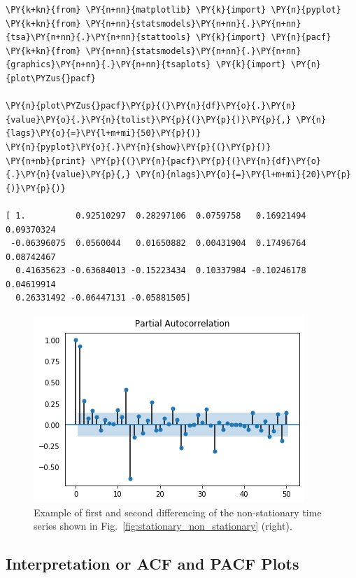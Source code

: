 \begin{codebox}[breakable, size=fbox, boxrule=1pt, pad at break*=1mm,colback=cellbackground, colframe=cellborder]
\begin{Verbatim}[commandchars=\\\{\}]
\PY{k+kn}{from} \PY{n+nn}{matplotlib} \PY{k}{import} \PY{n}{pyplot}
\PY{k+kn}{from} \PY{n+nn}{statsmodels}\PY{n+nn}{.}\PY{n+nn}{tsa}\PY{n+nn}{.}\PY{n+nn}{stattools} \PY{k}{import} \PY{n}{pacf}
\PY{k+kn}{from} \PY{n+nn}{statsmodels}\PY{n+nn}{.}\PY{n+nn}{graphics}\PY{n+nn}{.}\PY{n+nn}{tsaplots} \PY{k}{import} \PY{n}{plot\PYZus{}pacf}

\PY{n}{plot\PYZus{}pacf}\PY{p}{(}\PY{n}{df}\PY{o}{.}\PY{n}{value}\PY{o}{.}\PY{n}{tolist}\PY{p}{(}\PY{p}{)}\PY{p}{,} \PY{n}{lags}\PY{o}{=}\PY{l+m+mi}{50}\PY{p}{)}
\PY{n}{pyplot}\PY{o}{.}\PY{n}{show}\PY{p}{(}\PY{p}{)}
\PY{n+nb}{print} \PY{p}{(}\PY{n}{pacf}\PY{p}{(}\PY{n}{df}\PY{o}{.}\PY{n}{value}\PY{p}{,} \PY{n}{nlags}\PY{o}{=}\PY{l+m+mi}{20}\PY{p}{)}\PY{p}{)}

[ 1.          0.92510297  0.28297106  0.0759758   0.16921494  0.09370324
 -0.06396075  0.0560044   0.01650882  0.00431904  0.17496764  0.08742467
  0.41635623 -0.63684013 -0.15223434  0.10337984 -0.10246178  0.04619914
  0.26331492 -0.06447131 -0.05881505]
\end{Verbatim}
\end{codebox}

\begin{figure}[htb]
	\centering
	\includegraphics[width=0.7\linewidth]{figures/pacf_plot.png}
	\caption{Example of first and second differencing of the non-stationary time series shown in Fig.~\ref{fig:stationary_non_stationary} (right).}
	\label{fig:pacf}
\end{figure}
    
\subsection{Interpretation or ACF and PACF Plots}
\label{intuition-for-acf-and-pacf-plots}

